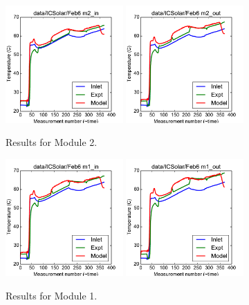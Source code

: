 \documentclass{article}
\begin{document}
\clearpage
\begin{figure}[!ht]
\centering
\includegraphics[width=0.4\textwidth]{../../data/ICSolar/images/Feb6_m2_in.pdf}\hspace{0.05\textwidth}
\includegraphics[width=0.4\textwidth]{../../data/ICSolar/images/Feb6_m2_out.pdf}\hspace{0.05\textwidth}\\
\caption{Results for Module 2.}\end{figure}
\begin{figure}[!ht]
\centering
\includegraphics[width=0.4\textwidth]{../../data/ICSolar/images/Feb6_m1_in.pdf}\hspace{0.05\textwidth}
\includegraphics[width=0.4\textwidth]{../../data/ICSolar/images/Feb6_m1_out.pdf}\hspace{0.05\textwidth}\\
\caption{Results for Module 1.}\end{figure}
\end{document}
